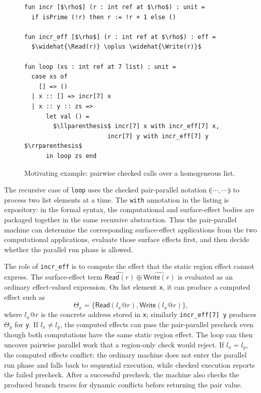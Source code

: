 \documentclass[10pt,a4paper]{article}
\makeatletter
\newcommand{\Read}{\mathsf{Read}}
\newcommand{\Write}{\mathsf{Write}}
\newcommand{\at}{\mathord{@}}
\newcommand{\pparl}{\mathopen{\llparenthesis}}
\newcommand{\pparr}{\mathclose{\rrparenthesis}}
\newcommand{\pairpar}[2]{\pparl\,#1,#2\,\pparr}
\makeatother
\begin{document}
\begin{figure}[ht]
\begin{lstlisting}
fun incr [$\rho$] (r : int ref at $\rho$) : unit =
  if isPrime (!r) then r := !r + 1 else ()

fun incr_eff [$\rho$] (r : int ref at $\rho$) : eff =
  $\widehat{\Read(r)} \oplus \widehat{\Write(r)}$

fun loop (xs : int ref at 7 list) : unit =
  case xs of
    [] => ()
  | x :: [] => incr[7] x
  | x :: y :: zs =>
      let val () =
        $\llparenthesis$ incr[7] x with incr_eff[7] x,
                       incr[7] y with incr_eff[7] y $\rrparenthesis$
      in loop zs end
\end{lstlisting}
\caption{Motivating example: pairwise checked calls over a homogeneous list.}
\label{fig:example}
\end{figure}

The recursive case of \lstinline|loop| uses the checked pair-parallel notation
$\pairpar{\cdots}{\cdots}$ to process two list elements at a time. The
\lstinline|with| annotation in the listing is expository: in the formal syntax,
the computational and surface-effect bodies are packaged together in the same
recursive abstraction. Thus the pair-parallel machine can determine the
corresponding surface-effect applications from the two computational
applications, evaluate those surface effects first, and then decide whether the
parallel run phase is allowed.

The role of \lstinline|incr_eff| is to compute the effect that the static region
effect cannot express. The surface-effect term
$\widehat{\Read(r)} \oplus \widehat{\Write(r)}$ is evaluated as an ordinary
effect-valued expression. On list element \lstinline|x|, it can produce a
computed effect such as
\[
  \Theta_x =
  \{\Read(l_x\at r),\Write(l_x\at r)\},
\]
where $l_x\at r$ is the concrete address stored in \lstinline|x|; similarly
\lstinline|incr_eff[7] y| produces $\Theta_y$ for \lstinline|y|. If
$l_x\neq l_y$, the computed effects can pass the pair-parallel precheck even
though both computations have the same static region effect. The loop can then
uncover pairwise parallel work that a region-only check would reject. If
$l_x=l_y$, the computed effects conflict: the ordinary machine does not enter
the parallel run phase and falls back to sequential execution, while checked
execution reports the failed precheck. After a successful precheck, the machine
also checks the produced branch traces for dynamic conflicts before returning
the pair value.
\end{document}
